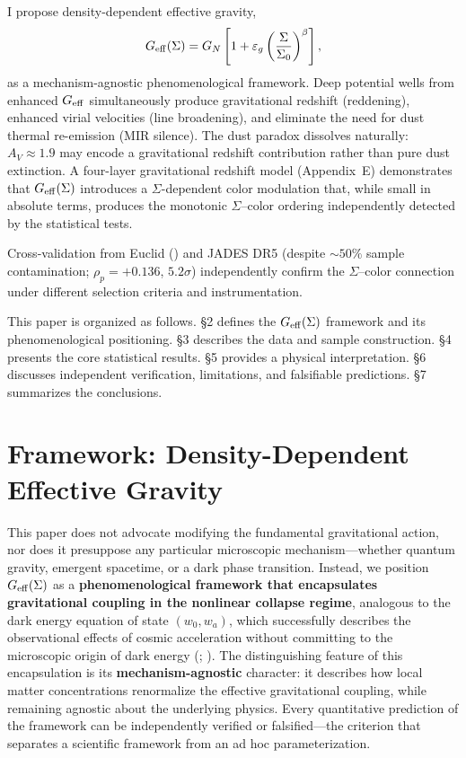 \documentclass[apj,twocolumn,longbibliography,linenumbers]{aastex701}
\begin{document}
I propose density-dependent effective gravity,
\begin{equation}
G_{\rm eff}(\Sigma) = G_N \left[1 + \varepsilon_g \left(\frac{\Sigma}{\Sigma_0}\right)^\beta\right],
\label{eq:Geff}
\end{equation}
as a mechanism-agnostic phenomenological framework. Deep potential wells from enhanced $G_{\rm eff}$ simultaneously produce gravitational redshift (reddening), enhanced virial velocities (line broadening), and eliminate the need for dust thermal re-emission (MIR silence). The dust paradox dissolves naturally: $A_V \approx 1.9$ may encode a gravitational redshift contribution rather than pure dust extinction. A four-layer gravitational redshift model (Appendix~E) demonstrates that $G_{\rm eff}(\Sigma)$ introduces a $\Sigma$-dependent color modulation that, while small in absolute terms, produces the monotonic $\Sigma$--color ordering independently detected by the statistical tests.

Cross-validation from Euclid (\citealt{Tumborang2026}) and JADES DR5 (despite ${\sim}50\%$ sample contamination; $\rho_p = +0.136$, $5.2\sigma$) independently confirm the $\Sigma$--color connection under different selection criteria and instrumentation.

This paper is organized as follows. \S2 defines the $G_{\rm eff}(\Sigma)$ framework and its phenomenological positioning. \S3 describes the data and sample construction. \S4 presents the core statistical results. \S5 provides a physical interpretation. \S6 discusses independent verification, limitations, and falsifiable predictions. \S7 summarizes the conclusions.


\section{Framework: Density-Dependent Effective Gravity}

This paper does not advocate modifying the fundamental gravitational action, nor does it presuppose any particular microscopic mechanism---whether quantum gravity, emergent spacetime, or a dark phase transition. Instead, we position $G_{\rm eff}(\Sigma)$ as a \textbf{phenomenological framework that encapsulates gravitational coupling in the nonlinear collapse regime}, analogous to the dark energy equation of state $(w_0, w_a)$, which successfully describes the observational effects of cosmic acceleration without committing to the microscopic origin of dark energy (\citealt{Chevallier2001}; \citealt{Linder2005}). The distinguishing feature of this encapsulation is its \textbf{mechanism-agnostic} character: it describes how local matter concentrations renormalize the effective gravitational coupling, while remaining agnostic about the underlying physics. Every quantitative prediction of the framework can be independently verified or falsified---the criterion that separates a scientific framework from an ad hoc parameterization.
\end{document}
